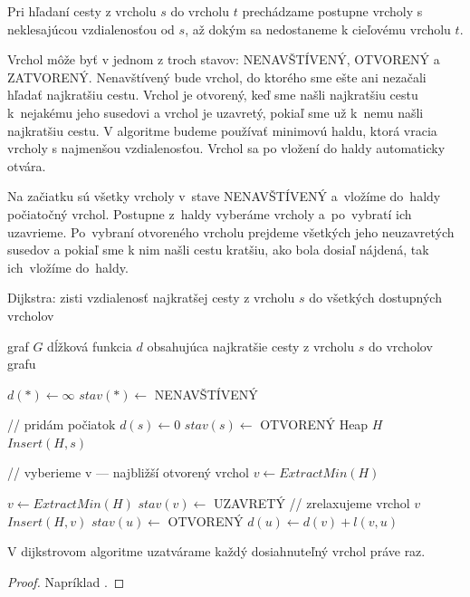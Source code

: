 Pri hľadaní cesty z vrcholu $s$ do vrcholu $t$ prechádzame postupne vrcholy s neklesajúcou vzdialenosťou od $s$, až dokým sa nedostaneme k cieľovému vrcholu $t$.

Vrchol môže byť v jednom z troch stavov: NENAVŠTÍVENÝ, OTVORENÝ a ZATVORENÝ.
Nenavštívený bude vrchol, do ktorého sme ešte ani nezačali hľadať najkratšiu cestu. Vrchol je otvorený, keď sme našli najkratšiu cestu 
k~nejakému jeho susedovi a vrchol je uzavretý, pokiaľ sme už k~nemu našli najkratšiu cestu.
V algoritme budeme používať minimovú haldu, ktorá vracia vrcholy s najmenšou vzdialenosťou.
Vrchol sa po vložení do haldy automaticky otvára.

Na začiatku sú všetky vrcholy v~stave NENAVŠTÍVENÝ a~vložíme do~haldy počiatočný vrchol.
Postupne z~haldy vyberáme vrcholy a~po~vybratí ich uzavrieme. 
Po~vybraní otvoreného vrcholu prejdeme všetkých jeho neuzavretých susedov a pokiaľ sme k nim našli cestu kratšiu, ako bola dosiaľ nájdená, tak ich~vložíme do~haldy.


\begin{algorithm}
\caption{Dijkstra: zisti vzdialenosť najkratšej cesty z vrcholu $s$ do všetkých dostupných vrcholov}
\label{alg:dijkstra}
\begin{algorithmic}[1] %
\REQUIRE graf $G$
\ENSURE dĺžková funkcia $d$ obsahujúca najkratšie cesty  z vrcholu $s$ do vrcholov grafu


\STATE $ d(*) \leftarrow \infty $
\STATE $ stav(*) \leftarrow$ NENAVŠTÍVENÝ

\STATE // pridám počiatok
\STATE $d(s) \leftarrow 0$
\STATE $stav(s) \leftarrow $ OTVORENÝ
\STATE Heap $H$
\STATE $Insert(H, s)$

	
	\STATE // vyberieme v --- najbližší otvorený vrchol
	\STATE $v \leftarrow ExtractMin(H)$
	
		\STATE $v \leftarrow ExtractMin(H)$
	\ENDWHILE
	\STATE $stav(v) \leftarrow$ UZAVRETÝ
	\STATE // zrelaxujeme vrchol $v$
			\STATE $Insert(H, v)$
			\STATE $stav(u) \leftarrow$ OTVORENÝ
			\STATE $d(u) \leftarrow d(v) + l(v, u)$
			
		\ENDIF
	\ENDFOR
\ENDWHILE

\end{algorithmic}
\end{algorithm}

\begin{theorem}
V dijkstrovom algoritme uzatvárame každý dosiahnuteľný vrchol práve raz.
\end{theorem}
\begin{proof}
Napríklad \cite{mares07}.
\end{proof}

